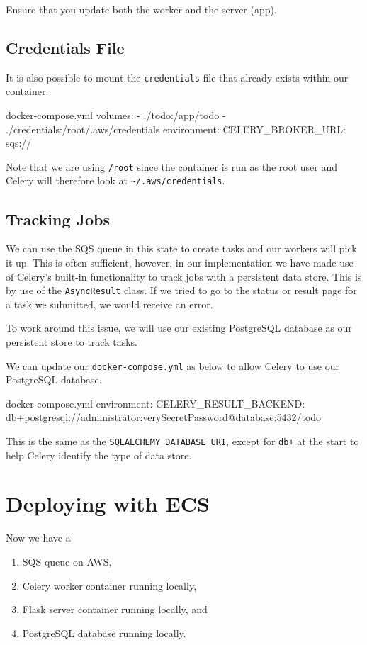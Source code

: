 \documentclass{csse4400}
\begin{document}
Ensure that you update both the worker and the server (app).

\subsection{Credentials File}

It is also possible to mount the \texttt{credentials} file that already exists within our container.
%
\begin{code}[numbers=none]{docker-compose.yml}
    volumes:
      - ./todo:/app/todo
      - ./credentials:/root/.aws/credentials
    environment:
      CELERY_BROKER_URL: sqs://
\end{code}

Note that we are using \texttt{/root} since the container is run as the root user and Celery will therefore look at \texttt{\textasciitilde/.aws/credentials}.

\subsection{Tracking Jobs}

We can use the SQS queue in this state to create tasks and our workers will pick it up.
This is often sufficient,
however, in our implementation we have made use of Celery's built-in functionality to track jobs with a persistent data store.
This is by use of the \texttt{AsyncResult} class.
If we tried to go to the status or result page for a task we submitted, we would receive an error.

To work around this issue,
we will use our existing PostgreSQL database as our persistent store to track tasks.

We can update our \texttt{docker-compose.yml} as below to allow Celery to use our PostgreSQL database.
%
\begin{code}[numbers=none]{docker-compose.yml}
    environment:
      CELERY_RESULT_BACKEND: db+postgresql://administrator:verySecretPassword@database:5432/todo
\end{code}

This is the same as the \texttt{SQLALCHEMY\_DATABASE\_URI},
except for \texttt{db+} at the start to help Celery identify the type of data store.


\section{Deploying with ECS}

Now we have a
\begin{enumerate}
    \item SQS queue on AWS,
    \item Celery worker container running locally,
    \item Flask server container running locally, and
    \item PostgreSQL database running locally.
\end{enumerate}
\end{document}
